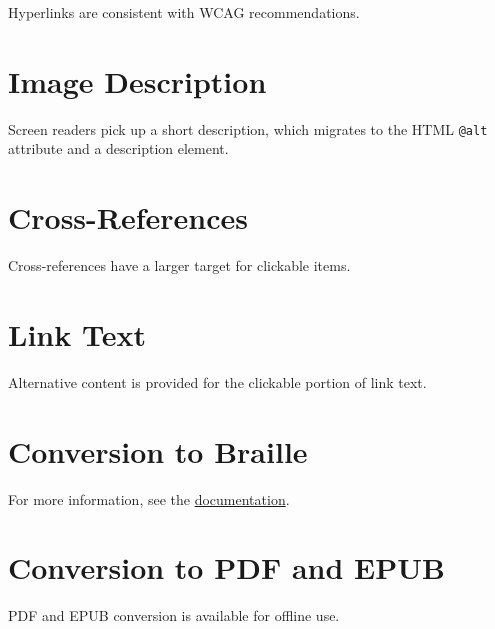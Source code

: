 \documentclass{article}
\begin{document}
Hyperlinks are consistent with WCAG recommendations.

\section{Image Description}

Screen readers pick up a short description, which migrates to the HTML \texttt{@alt} attribute and a description element.

\section{Cross-References}

Cross-references have a larger target for clickable items.

\section{Link Text}

Alternative content is provided for the clickable portion of link text.

\section{Conversion to Braille}

For more information, see the \href{https://pretextbook.org/doc/guide/html/publisher-braille.html}{documentation}.

\section{Conversion to PDF and EPUB}

PDF and EPUB conversion is available for offline use.
\end{document}
